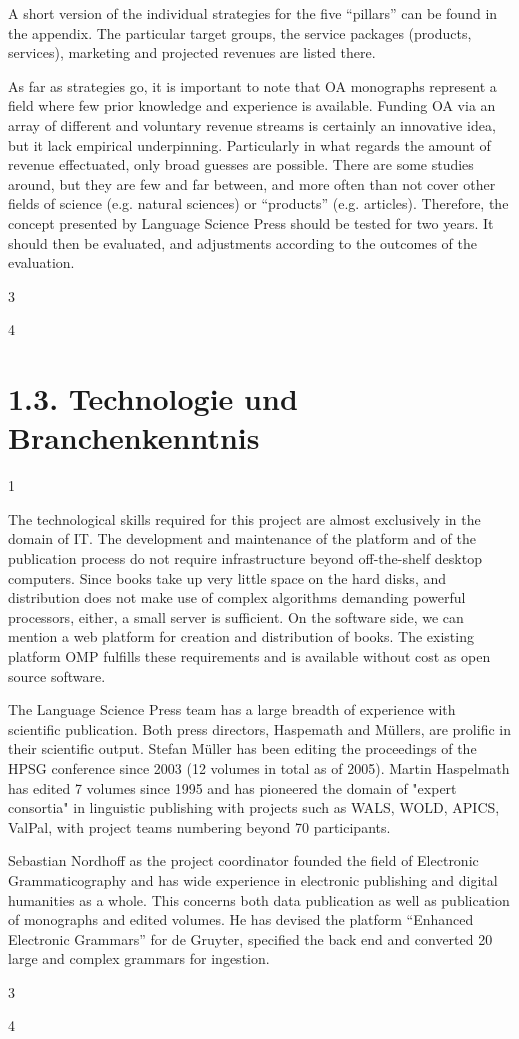 \documentclass[output=guidelines,draftmode]{langscibook}
\newcommand{\background}[1]{ 
  \vspace{5mm}
  \renewcommand{\tblslinecolour}{lsDarkBlue}
  \tblssy[red]{explore2}{Background}{#1}
}
\newcommand{\langscisolution}[1]{
  \renewcommand{\tblslinecolour}{lsLightBlue}
  \tblssy{langsci}{LangSci solution}{#1}
}
\newcommand{\evaluation}[1]{
  \renewcommand{\tblslinecolour}{lsLightOrange}
  \tblssy{receipt}{Evaluation}{#1}
}
\newcommand{\othersolutions}[1]{
  \renewcommand{\tblslinecolour}{lsDarkGreenOne}
  \tblssy{more}{Other solutions}{#1}
}
\renewcommand{\tblssy}[4][black!12]{%
  \renewcommand{\langscisymbol}{#2}\renewcommand{\tblsboxcolor}{#1}
  \begin{mdframed}[style=yellowexercise,frametitle={#3}]
    #4
  \end{mdframed}
}
\begin{document}
{A short version of the individual strategies for the five ``pillars'' can be found in the appendix. The particular target groups, the service packages (products, services), marketing and projected revenues are listed there.

As far as strategies go, it is important to note that OA monographs represent a field where few prior knowledge and experience is available. Funding OA via an array of different and voluntary revenue streams is certainly an innovative idea, but it lack empirical underpinning. Particularly in what regards the amount of revenue effectuated, only broad guesses are possible. There are some studies around, but they are few and far between, and more often than not cover other fields of science (e.g. natural sciences) or ``products'' (e.g. articles). Therefore, the concept presented by Language Science Press should be tested for two years. It should then be evaluated, and adjustments according to the outcomes of the evaluation. 
}
\evaluation{3}
\othersolutions{4}
\section{1.3. Technologie und Branchenkenntnis}

\background{1}
\langscisolution{
The technological skills required for this project are almost exclusively in the domain of IT. The development and maintenance of the platform and of the publication process do not require infrastructure beyond off-the-shelf desktop computers. Since books take up very little space on the hard disks, and distribution does not make use of complex algorithms demanding powerful processors, either, a small server is sufficient. 
On the software side, we can mention a web platform for creation and distribution of books. The existing platform OMP fulfills these requirements and is available without cost as open source software.

The Language Science Press team has a large breadth of experience with scientific publication. Both press directors, Haspemath and Müllers, are prolific in their scientific output. Stefan Müller has been editing the proceedings of the HPSG conference since 2003 (12 volumes in total as of 2005). Martin Haspelmath has edited 7 volumes since 1995 and has pioneered the domain of "expert consortia" in linguistic publishing with projects such as WALS, WOLD, APICS, ValPal, with project teams numbering beyond 70 participants. 

Sebastian Nordhoff as the project coordinator founded the field of Electronic Grammaticography and has wide experience in electronic publishing and digital humanities as a whole. This concerns both data publication as well as publication of monographs and edited volumes. He has devised the platform ``Enhanced Electronic Grammars'' for de Gruyter, specified the back end and converted 20 large and complex grammars for ingestion.
}
\evaluation{3}
\othersolutions{4}
\end{document}
